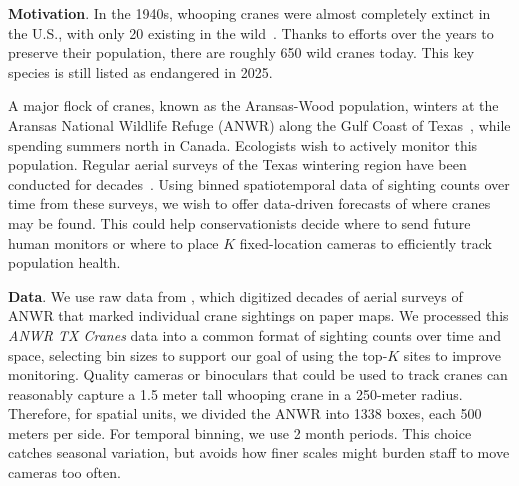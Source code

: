 \textbf{Motivation}. 
In the 1940s, whooping cranes were almost completely extinct in the U.S., with only 20 existing in the wild~\citep{cannon1996whooping}. Thanks to efforts over the years to preserve their population, there are roughly 650 wild cranes today. This key species is still listed as endangered in 2025. %


A major flock of cranes, known as the Aransas-Wood population, winters at the Aransas National Wildlife Refuge (ANWR) along the Gulf Coast of Texas~\citep{aransas_wood}, while spending summers north in Canada. 
Ecologists wish to actively monitor this population.
Regular aerial surveys of the Texas wintering region have been conducted for decades~\citep{asurv}.
Using binned spatiotemporal data of sighting counts over time from these surveys, we wish to offer data-driven forecasts of where cranes may be found. 
This could help conservationists decide where to send future human monitors or where to place $K$ fixed-location cameras to efficiently track population health.


\textbf{Data}. 
We use raw data from \citet{asurv}, which digitized decades of aerial surveys of ANWR that marked individual crane sightings on paper maps. %
We processed this \emph{ANWR TX Cranes} data into a common format of sighting counts over time and space, selecting bin sizes to support our goal of using the top-$K$ sites to improve monitoring.
Quality cameras or binoculars that could be used to track cranes can reasonably capture a 1.5 meter tall whooping crane in a 250-meter radius. Therefore, for spatial units, we divided the ANWR into 1338 boxes, each 500 meters per side. 
For temporal binning, we use 2 month periods.
This choice catches seasonal variation, but avoids how finer scales might burden staff to move cameras too often.

